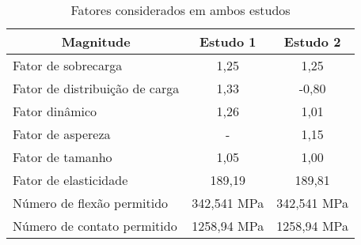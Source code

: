 \begin{table}
\centering
\caption{\label{tab:x} Fatores considerados em ambos estudos}
\begin{tabular}{lcc} \\ \hline
\multicolumn{1}{c}{\textbf{Magnitude}} & \textbf{Estudo 1} & \textbf{Estudo 2} \\ \hline
Fator de sobrecarga                    & 1,25              & 1,25              \\
Fator de distribuição de carga         & 1,33              & -0,80             \\
Fator dinâmico                         & 1,26              & 1,01              \\
Fator de aspereza                      & -                 & 1,15              \\
Fator de tamanho                       & 1,05              & 1,00              \\
Fator de elasticidade                  & 189,19            & 189,81            \\
Número de flexão permitido             & 342,541 MPa       & 342,541 MPa       \\
Número de contato permitido            & 1258,94 MPa       & 1258,94 MPa   \\ \hline  
\end{tabular}
\end{table}